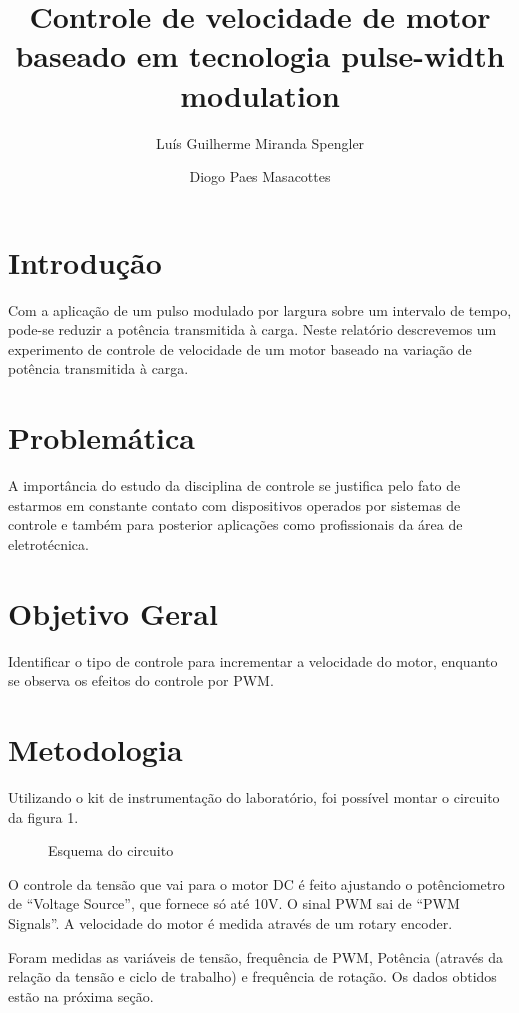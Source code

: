 \documentclass{article}
\title{Controle de velocidade de motor baseado em tecnologia pulse-width modulation}
\date{}
\author[1]{Luís Guilherme Miranda Spengler}
\author[2]{Diogo Paes Masacottes}
\affil[1,2]{Instituto Federal de Educação, Ciência e Tecnologia de Mato Grosso do Sul}
\begin{document}
\maketitle

\section{Introdução}
Com a aplicação de um pulso modulado por largura sobre um intervalo de tempo, pode-se reduzir a potência transmitida à carga. Neste relatório descrevemos um experimento de controle de velocidade de um motor baseado na variação de potência transmitida à carga.

\section{Problemática}
A importância do estudo da disciplina de controle se justifica pelo fato de estarmos em constante contato com dispositivos operados por sistemas de controle e também para posterior aplicações como profissionais da área de eletrotécnica.

\section{Objetivo Geral}
Identificar o tipo de controle para incrementar a velocidade do motor, enquanto se observa os efeitos do controle por PWM.

\clearpage
\section{Metodologia}

Utilizando o kit de instrumentação do laboratório, foi possível montar o circuito da figura 1.

\begin{figure}[h!]
\centering
\def\svgwidth{0.6\columnwidth}

\caption{Esquema do circuito}
\end{figure}

O controle da tensão que vai para o motor DC é feito ajustando o potênciometro de ``Voltage Source'', que fornece só até 10V. O sinal PWM sai de ``PWM Signals''. A velocidade do motor é medida através de um rotary encoder.

Foram medidas as variáveis de tensão, frequência de PWM, Potência (através da relação da tensão e ciclo de trabalho) e frequência de rotação. Os dados obtidos estão na próxima seção.
\end{document}
